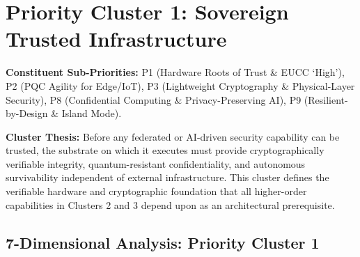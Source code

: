 
\section{Priority Cluster 1: Sovereign Trusted Infrastructure}
\label{sec:cluster1}

\noindent\textbf{Constituent Sub-Priorities:} P1 (Hardware Roots of Trust \& EUCC `High'),
P2 (PQC Agility for Edge/IoT), P3 (Lightweight Cryptography \& Physical-Layer Security),
P8 (Confidential Computing \& Privacy-Preserving AI), P9 (Resilient-by-Design \& Island Mode).

\medskip
\noindent\textbf{Cluster Thesis:} Before any federated or AI-driven security capability can be
trusted, the substrate on which it executes must provide cryptographically verifiable integrity,
quantum-resistant confidentiality, and autonomous survivability independent of external
infrastructure. This cluster defines the verifiable hardware and cryptographic foundation that
all higher-order capabilities in Clusters 2 and 3 depend upon as an architectural prerequisite.

\subsection*{7-Dimensional Analysis: Priority Cluster 1}

